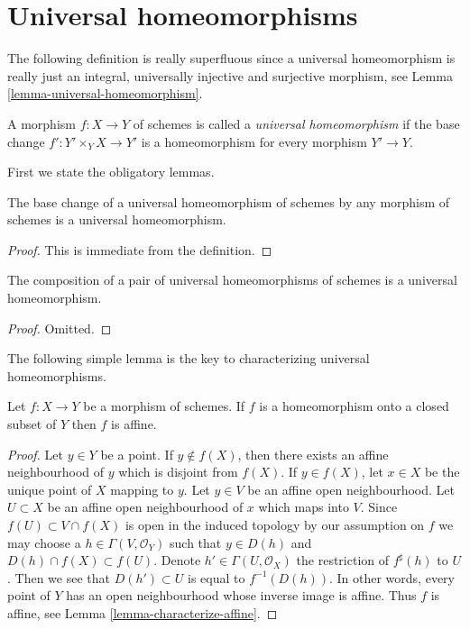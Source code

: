 \section{Universal homeomorphisms}
\label{section-universal-homeomorphisms}

\noindent
The following definition is really superfluous since a universal
homeomorphism is really just an integral, universally injective
and surjective morphism, see
Lemma \ref{lemma-universal-homeomorphism}.

\begin{definition}
\label{definition-universal-homeomorphism}
A morphism $f : X \to Y$ of schemes is called a {\it universal homeomorphism}
if the base change $f' : Y' \times_Y X \to Y'$ is a homeomorphism for
every morphism $Y' \to Y$.
\end{definition}

\noindent
First we state the obligatory lemmas.

\begin{lemma}
\label{lemma-base-change-universal-homeomorphism}
The base change of a universal homeomorphism of schemes
by any morphism of schemes is a universal homeomorphism.
\end{lemma}

\begin{proof}
This is immediate from the definition.
\end{proof}

\begin{lemma}
\label{lemma-composition-universal-homeomorphism}
The composition of a pair of universal homeomorphisms of
schemes is a universal homeomorphism.
\end{lemma}

\begin{proof}
Omitted.
\end{proof}

\noindent
The following simple lemma is the key to characterizing universal
homeomorphisms.

\begin{lemma}
\label{lemma-homeomorphism-affine}
Let $f : X \to Y$ be a morphism of schemes. If $f$ is a homeomorphism
onto a closed subset of $Y$ then $f$ is affine.
\end{lemma}

\begin{proof}
Let $y \in Y$ be a point. If $y \not \in f(X)$, then there exists
an affine neighbourhood of $y$ which is disjoint from $f(X)$.
If $y \in f(X)$, let $x \in X$ be the unique point of $X$ mapping to $y$.
Let $y \in V$ be an affine open neighbourhood.
Let $U \subset X$ be an affine open neighbourhood of $x$ which maps into $V$.
Since $f(U) \subset V \cap f(X)$ is open in the induced topology by our
assumption on $f$ we may choose a
$h \in \Gamma(V, \mathcal{O}_Y)$ such that $y \in D(h)$
and $D(h) \cap f(X) \subset f(U)$. Denote $h' \in \Gamma(U, \mathcal{O}_X)$
the restriction of $f^\sharp(h)$ to $U$. Then we see that
$D(h') \subset U$ is equal to $f^{-1}(D(h))$. In other words, every point
of $Y$ has an open neighbourhood whose inverse image is affine.
Thus $f$ is affine, see
Lemma \ref{lemma-characterize-affine}.
\end{proof}

